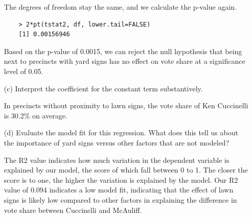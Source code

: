 \documentclass[12pt,letterpaper]{article}
\begin{document}
\begin{enumerate}
The degrees of freedom stay the same, and we calculate the p-value again.



\begin{verbatim}
	> 2*pt(tstat2, df, lower.tail=FALSE)
	[1] 0.00156946
\end{verbatim}

Based on  the p-value of 0.0015, we can reject the null hypothesis that being next to precincts with yard signs has no effect on vote share at a significance level of 0.05.

	\vspace{7cm}
	\item [(c)] Interpret the coefficient for the constant term substantively.
	\vspace{.5cm}
	
	In precincts without proximity to lawn signs, the vote share of Ken Cuccinelli is 30.2\% on average.
	\vspace{.5cm}
	\item [(d)] Evaluate the model fit for this regression.  What does this	tell us about the importance of yard signs versus other factors that are not modeled?
	\vspace{.5cm}
	
	The R2 value indicates how much variation in the dependent variable is explained by our model, the score of which fall between 0 to 1. The closer the score is to one, the higher the variation is explained by the model. Our R2 value of 0.094 indicates a low model fit, indicating that the effect of lawn signs is likely low compared to other factors in explaining the difference in vote share between Cuccinelli and McAuliff.
	
\end{enumerate}  
\end{document}
